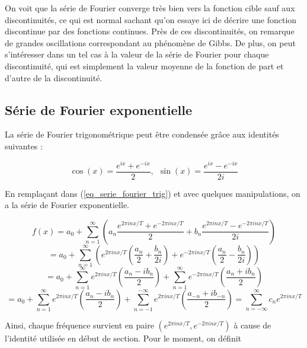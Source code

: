 On voit que la série de Fourier converge très bien vers la fonction cible sauf aux discontinuités, ce qui est normal sachant qu'on essaye ici de décrire une fonction discontinue par des fonctions continues. Près de ces discontinuités, on remarque de grandes oscillations correspondant au phénomène de Gibbs. De plus, on peut s'intéresser dans un tel cas à la valeur de la série de Fourier pour chaque discontinuité, qui est simplement la valeur moyenne de la fonction de part et d'autre de la discontinuité. 

\subsection{Série de Fourier exponentielle}
La série de Fourier trigonométrique peut être condensée grâce aux identités suivantes :

\begin{equation*}
    \cos(x) = \frac{e^{ix} + e^{-ix}}{2}, \ \ \sin(x) = \frac{e^{ix} - e^{-ix}}{2i}
\end{equation*}

En remplaçant dans (\ref{eq_serie_fourier_trig}) et avec quelques manipulations, on a la série de Fourier exponentielle.

\begin{equation*}
    f(x) = a_0 + \sum_{n=1}^{\infty}\left(a_n \frac{e^{2\pi inx/T} + e^{-2\pi inx/T}}{2} + b_n \frac{e^{2\pi inx/T} - e^{-2\pi inx/T}}{2i}\right)
\end{equation*}
\begin{equation*}
    = a_0 + \sum_{n=1}^{\infty}\left(e^{2\pi inx/T}\left(\frac{a_n}{2} + \frac{b_n}{2i}\right) + e^{-2\pi inx/T}\left(\frac{a_n}{2} - \frac{b_n}{2i}\right)\right)
\end{equation*}
\begin{equation*}
    = a_0 + \sum_{n=1}^{\infty}e^{2\pi inx/T}\left(\frac{a_n - ib_n}{2}\right) + \sum_{n=1}^{\infty}e^{-2\pi inx/T}\left(\frac{a_n + ib_n}{2}\right)
\end{equation*}
\begin{equation}
    = a_0 + \sum_{n=1}^{\infty}e^{2\pi inx/T}\left(\frac{a_n - ib_n}{2}\right) + \sum_{n=-1}^{-\infty}e^{2\pi inx/T}\left(\frac{a_{-n} + ib_{-n}}{2}\right) = \sum_{n = -\infty}^{\infty}c_ne^{2\pi inx/T}
    \label{eq_serie_fourier_exp}
\end{equation}

Ainsi, chaque fréquence survient en paire $\left(e^{2\pi inx/T}, e^{-2\pi inx/T}\right)$ à cause de l'identité utilisée en début de section. Pour le moment, on définit 

